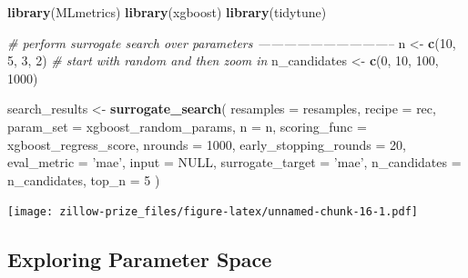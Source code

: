 \documentclass[]{book}
\newenvironment{Shaded}{\begin{snugshade}}{\end{snugshade}}
\newcommand{\KeywordTok}[1]{\textcolor[rgb]{0.13,0.29,0.53}{\textbf{#1}}}
\newcommand{\DataTypeTok}[1]{\textcolor[rgb]{0.13,0.29,0.53}{#1}}
\newcommand{\DecValTok}[1]{\textcolor[rgb]{0.00,0.00,0.81}{#1}}
\newcommand{\StringTok}[1]{\textcolor[rgb]{0.31,0.60,0.02}{#1}}
\newcommand{\CommentTok}[1]{\textcolor[rgb]{0.56,0.35,0.01}{\textit{#1}}}
\newcommand{\OtherTok}[1]{\textcolor[rgb]{0.56,0.35,0.01}{#1}}
\newcommand{\OperatorTok}[1]{\textcolor[rgb]{0.81,0.36,0.00}{\textbf{#1}}}
\newcommand{\NormalTok}[1]{#1}
\theoremstyle{definition}
\theoremstyle{definition}
\theoremstyle{definition}
\theoremstyle{remark}
\begin{document}
\begin{Shaded}
\begin{Highlighting}[]
\KeywordTok{library}\NormalTok{(MLmetrics)}
\KeywordTok{library}\NormalTok{(xgboost)}
\KeywordTok{library}\NormalTok{(tidytune)}

\CommentTok{# perform surrogate search over parameters --------------------------------}
\NormalTok{n <-}\StringTok{ }\KeywordTok{c}\NormalTok{(}\DecValTok{10}\NormalTok{, }\DecValTok{5}\NormalTok{, }\DecValTok{3}\NormalTok{, }\DecValTok{2}\NormalTok{)}
\CommentTok{# start with random and then zoom in}
\NormalTok{n_candidates <-}\StringTok{ }\KeywordTok{c}\NormalTok{(}\DecValTok{0}\NormalTok{, }\DecValTok{10}\NormalTok{, }\DecValTok{100}\NormalTok{, }\DecValTok{1000}\NormalTok{)}

\NormalTok{search_results <-}\StringTok{ }
\StringTok{  }\KeywordTok{surrogate_search}\NormalTok{(}
    \DataTypeTok{resamples =}\NormalTok{ resamples,}
    \DataTypeTok{recipe =}\NormalTok{ rec,}
    \DataTypeTok{param_set =}\NormalTok{ xgboost_random_params,}
    \DataTypeTok{n =}\NormalTok{ n,}
    \DataTypeTok{scoring_func =}\NormalTok{ xgboost_regress_score,}
    \DataTypeTok{nrounds =} \DecValTok{1000}\NormalTok{,}
    \DataTypeTok{early_stopping_rounds =} \DecValTok{20}\NormalTok{,}
    \DataTypeTok{eval_metric =} \StringTok{'mae'}\NormalTok{,}
    \DataTypeTok{input =} \OtherTok{NULL}\NormalTok{,}
    \DataTypeTok{surrogate_target =} \StringTok{'mae'}\NormalTok{,}
    \DataTypeTok{n_candidates =}\NormalTok{ n_candidates,}
    \DataTypeTok{top_n =} \DecValTok{5}
\NormalTok{  )}
\end{Highlighting}
\end{Shaded}

\begin{Shaded}
\end{Shaded}

\texttt{[image: zillow-prize\_files/figure-latex/unnamed-chunk-16-1.pdf]}

\subsection{Exploring Parameter Space}\label{exploring-parameter-space}
\end{document}
